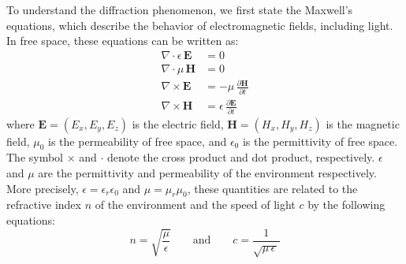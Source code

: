 \documentclass{article}
\begin{document}
To understand the diffraction phenomenon, we first state the Maxwell's equations, which describe the behavior of electromagnetic fields, including light. In free space, these equations can be written as:
\begin{align}
\nabla \cdot \epsilon \, \mathbf{E} &= 0 \\
\nabla \cdot \mu \,\mathbf{H} &= 0 \\
\nabla \times \mathbf{E} &= -\mu \,\frac{\partial \mathbf{H}}{\partial t} \\
\nabla \times \mathbf{H} &= \epsilon \,\frac{\partial \mathbf{E}}{\partial t} 
\end{align}
where $\mathbf{E} = (E_x, E_y, E_z)$ is the electric field, $\mathbf{H} = (H_x, H_y, H_z)$ is the magnetic field, $\mu_0$ is the permeability of free space, and $\epsilon_0$ is the permittivity of free space.
The symbol $\times$ and $\cdot$ denote the cross product and dot product, respectively.
$\epsilon$ and $\mu$ are the permittivity and permeability of the environment respectively. More precisely, $\epsilon = \epsilon_r \epsilon_0$ and $\mu = \mu_r \mu_0$, these quantities are related to the refractive index $n$ of the environment and the speed of light $c$ by the following equations:
\begin{equation}\label{eq:refractive_index}
n = \sqrt{\frac{\mu}{\epsilon}}  \qquad \text{and} \qquad c = \frac{1}{\sqrt{\mu \, \epsilon \,}}
\end{equation}
\end{document}
